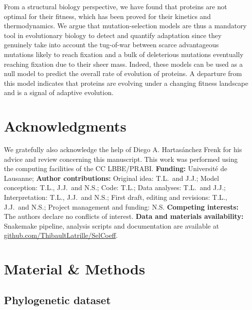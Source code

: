 \documentclass{article}
\begin{document}
    From a structural biology perspective, we have found that proteins are not optimal for their fitness, which has been proved for their kinetics and thermodynamics\cite{taverna_why_2002, goldstein_evolution_2011}.
    We argue that mutation-selection models are thus a mandatory tool in evolutionary biology to detect and quantify adaptation since they genuinely take into account the tug-of-war between scarce advantageous mutations likely to reach fixation and a bulk of deleterious mutations eventually reaching fixation due to their sheer mass.
    Indeed, these models can be used as a null model to predict the overall rate of evolution of proteins\cite{spielman_relationship_2015, dosreis_how_2015}.
    A departure from this model indicates that proteins are evolving under a changing fitness landscape\cite{rodrigue_detecting_2017, tamuri_mutationselection_2021} and is a signal of adaptive evolution\cite{rodrigue_bayesian_2021}.


    \section*{Acknowledgments}
    \label{sec:acknowledgment}
    We gratefully also acknowledge the help of Diego A. Hartasánchez Frenk for his advice and review concerning this manuscript.
    This work was performed using the computing facilities of the CC LBBE/PRABI\@.
    \textbf{Funding:}
    Université de Lausanne;
    \textbf{Author contributions:}
    Original idea: T.L.\ and J.J.;
    Model conception: T.L., J.J.\ and N.S.;
    Code: T.L.;
    Data analyses: T.L.\ and J.J.;
    Interpretation: T.L., J.J.\ and N.S.;
    First draft, editing and revisions: T.L., J.J.\ and N.S.;
    Project management and funding: N.S\@.
    \textbf{Competing interests:}
    The authors declare no conflicts of interest.
    \textbf{Data and materials availability:}
    Snakemake pipeline, analysis scripts and documentation are available at \href{https://github.com/ThibaultLatrille/SelCoeff}{github.com/ThibaultLatrille/SelCoeff}.


    \section{Material \& Methods}
    \label{sec:methods}

    \subsection{Phylogenetic dataset}
\end{document}

